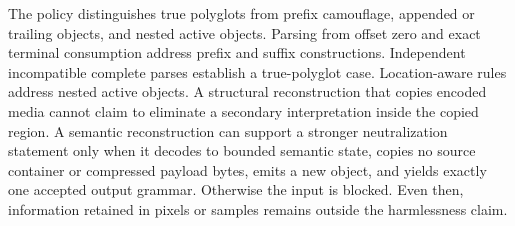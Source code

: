 The \AFD{} policy distinguishes true polyglots from prefix camouflage,
appended or trailing objects, and nested active objects. Parsing from offset
zero and exact terminal consumption address prefix and suffix constructions.
Independent incompatible complete parses establish a true-polyglot case.
Location-aware rules address nested active objects. A structural reconstruction
that copies encoded media cannot claim to eliminate a secondary interpretation
inside the copied region. A semantic reconstruction can support a stronger
neutralization statement only when it decodes to bounded semantic state,
copies no source container or compressed payload bytes, emits a new object,
and yields exactly one accepted output grammar. Otherwise the input is blocked.
Even then, information retained in pixels or samples remains outside the
harmlessness claim.

